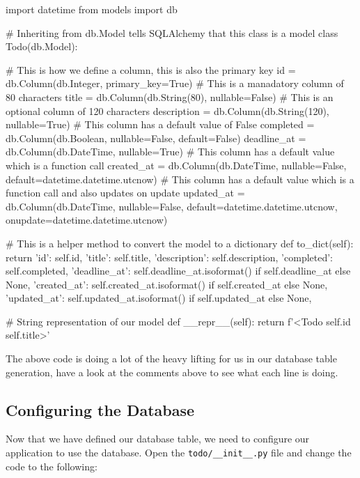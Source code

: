 \documentclass{csse4400}
\begin{document}
\begin{code}[language=python,numbers=none]{}
  import datetime
  from models import db

  # Inheriting from db.Model tells SQLAlchemy that this class is a model
  class Todo(db.Model):

      # This is how we define a column, this is also the primary key
      id = db.Column(db.Integer, primary_key=True)
      # This is a manadatory column of 80 characters
      title = db.Column(db.String(80), nullable=False)
      # This is an optional column of 120 characters
      description = db.Column(db.String(120), nullable=True)
      # This column has a default value of False
      completed = db.Column(db.Boolean, nullable=False, default=False)
      deadline_at = db.Column(db.DateTime, nullable=True)
      # This column has a default value which is a function call
      created_at = db.Column(db.DateTime, nullable=False, default=datetime.datetime.utcnow)
      # This column has a default value which is a function call and also updates on update
      updated_at = db.Column(db.DateTime, nullable=False, default=datetime.datetime.utcnow, onupdate=datetime.datetime.utcnow)

      # This is a helper method to convert the model to a dictionary
      def to_dict(self):
          return {
              'id': self.id,
              'title': self.title,
              'description': self.description,
              'completed': self.completed,
              'deadline_at': self.deadline_at.isoformat() if self.deadline_at else None,
              'created_at': self.created_at.isoformat() if self.created_at else None,
              'updated_at': self.updated_at.isoformat() if self.updated_at else None,
          }

      # String representation of our model
      def __repr__(self):
          return f'<Todo {self.id} {self.title}>'
\end{code}

The above code is doing a lot of the heavy lifting for us in our database table generation, have a look at the comments above to see what each line is doing.


\subsection{Configuring the Database}

Now that we have defined our database table, we need to configure our application to use the database. Open the \texttt{todo/\_\_init\_\_.py} file and change the code to the following:
\end{document}
